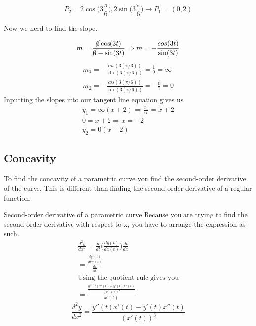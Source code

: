 \documentclass[./MATH-115-Notes.tex]{subfiles}
\begin{document}
$$
    P_2 = 2\cos\biggl(3\frac{\pi}{6}\biggl), 2\sin\biggl(3\frac{\pi}{6}\biggl) \rightarrow P_1 = (0,2)
$$

Now we need to find the slope.

$$
    m = \frac{\cancel{6}\cos(3t)}{\cancel{6}-\sin(3t)} \Rightarrow m = -\frac{cos(3t)}{\sin(3t)}
$$
\begin{gather*}
    m_1 = -\frac{cos(3(\pi/3))}{\sin(3(\pi/3))} = \frac{1}{0} = \infty\\
    m_2 = -\frac{cos(3(\pi/6))}{\sin(3(\pi/6))} = -\frac{0}{1} = 0
\end{gather*}
Inputting the slopes into our tangent line equation gives us
\begin{gather*}
    y_1 = \infty(x+2) \Rightarrow \frac{y_1}{\infty} = x + 2\\
    0 = x + 2 \Rightarrow x = -2\\
    y_2 = 0(x-2)
\end{gather*}
\newpage




\subsection{Concavity}
To find the concavity of a parametric curve you find the second-order derivative of the curve. This is different than finding the second-order derivative of a regular function.   
\begin{paperbox}{Second-order derivative of a parametric curve}
    Because you are trying to find the second-order derivative with respect to x, you have to arrange the expression as such.
    \begin{gather*}
        \frac{d^2y}{dx^2} = \frac{d}{dt}\biggl(\frac{dy(t)}{dx(t)}\biggl)\frac{dt}{dx}\\
        = \frac{\frac{dy'(t)}{dtx'(t)}}{\frac{dx}{dt}}\\
        \text{Using the quotient rule gives you}\\
        = \frac{\frac{y''(t)x'(t) - y'(t)x''(t)}{(x'(t))^2}}{x'(t)}
    \end{gather*}
    \begin{equation}
        \frac{d^2y}{dx^2} = \frac{y''(t)x'(t) - y'(t)x''(t)}{(x'(t))^3}
    \end{equation}
\end{paperbox}
\end{document}
